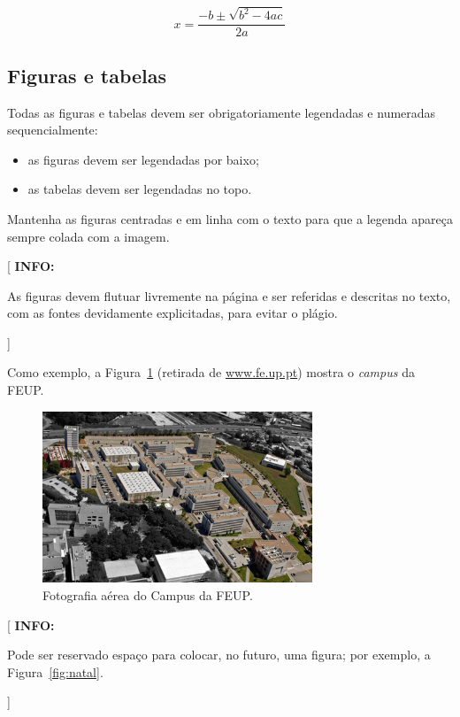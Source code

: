 \documentclass[11pt,a4paper]{report}
\newenvironment{info}[1]{\vspace*{6mm}\color{blue}[ \textbf{INFO:} \begin{em} #1}
                        {\vspace*{3mm}\end{em} ]}
\begin{document}
\begin{equation} \label{eq:2}
  x=\frac{-b\pm \sqrt{b^2-4ac}}{2a}
\end{equation}

\subsection*{Figuras e tabelas}

Todas as figuras e tabelas devem ser obrigatoriamente legendadas e
numeradas sequencialmente:

\begin{itemize}
\item as figuras devem ser legendadas por baixo;
\item as tabelas devem ser legendadas no topo. 
\end{itemize}

Mantenha as figuras centradas e em linha com o texto para que a
legenda apareça sempre colada com a imagem.

\begin{info}
As figuras devem flutuar livremente na página e ser referidas e
descritas no texto, com as fontes devidamente explicitadas, para
evitar o plágio.
\end{info}

Como exemplo, a Figura~\ref{fig:campus} (retirada de
\url{www.fe.up.pt}) mostra o \emph{campus} da FEUP. 

\lipsum[1]

\begin{figure}
\centering
\includegraphics[width=0.72\textwidth]{campus}
\caption{Fotografia aérea do Campus da FEUP.} \label{fig:campus}
\end{figure}

\lipsum[2]

\begin{info}
Pode ser reservado espaço para colocar, no futuro, uma figura; por
exemplo, a Figura~\ref{fig:natal}.
\end{info}
\end{document}
